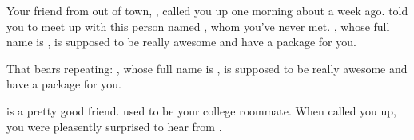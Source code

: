 \documentclass[char]{guildcamp4}
\begin{document}
\name{\cTest{}}

\updatemacro{\cNPC}{
  \unknownplayer %
  }





Your friend from out of town, \cSomeGuy{\intro}, called you up one
morning about a week ago. \cSomeGuy{} told you to meet up with this
person named \cNPC{\intro}, whom you've never met. \cNPC{}, whose full name
is \cNPC{\intro}, is supposed to be really awesome and have a package
for you.

That bears repeating: \cNPC{\nick{\informal}}, whose full name is
\cNPC{\full}, is supposed to be really awesome and have a package for
you.

\cSomeGuy{} is a pretty good friend. \cSomeGuy{\They} used to be your
college roommate. When \cSomeGuy{\they} called you up, you were
pleasently surprised to hear from \cSomeGuy{\them}.
\end{document}
